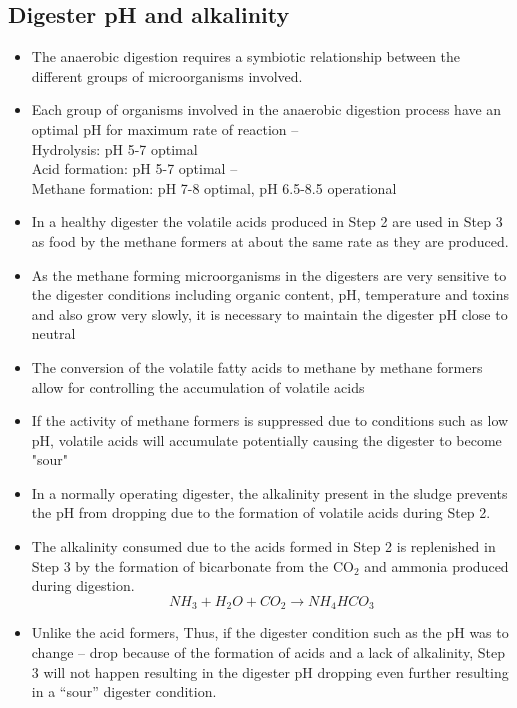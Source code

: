 \subsection{Digester pH and alkalinity}
                    \begin{itemize}
                        \item The anaerobic digestion requires a symbiotic relationship between the different groups of microorganisms involved. 
                        \item Each group of organisms involved in the anaerobic digestion process have an optimal pH for maximum rate of reaction – \\
                        Hydrolysis: pH 5-7 optimal\\ 
                        Acid formation: pH 5-7 optimal – \\
                        Methane formation: pH 7-8 optimal, pH 6.5-8.5 operational\\
                        \item In a healthy digester the volatile acids produced in Step 2 are used in Step 3 as food by the methane formers at about the same rate as they are produced.  
                        \item As the methane forming microorganisms in the digesters are very sensitive to the digester conditions including organic content, pH, temperature and toxins and also grow very slowly, it is necessary to maintain the digester pH close to neutral
                        \item The conversion of the volatile fatty acids to methane by methane formers allow for controlling the accumulation of volatile acids
                        \item If the activity of methane formers is suppressed due to conditions such as low pH, volatile acids will accumulate potentially causing the digester to become "sour"
                        \item In a normally operating digester, the alkalinity present in the sludge prevents the pH from dropping due to the formation of volatile acids during Step 2.
                        \item The alkalinity consumed due to the acids formed in Step 2 is replenished in Step 3 by the formation of bicarbonate from the CO$_2$ and ammonia produced during digestion.\\
                        $$NH_3+H_2O+CO_2 \to NH_4HCO_3$$  
                         \item Unlike the acid formers,   Thus, if the digester condition such as the pH was to change – drop because of the formation of acids and a lack of alkalinity, Step 3 will not happen resulting in the digester pH dropping even further resulting in a “sour” digester condition.

\end{itemize}
